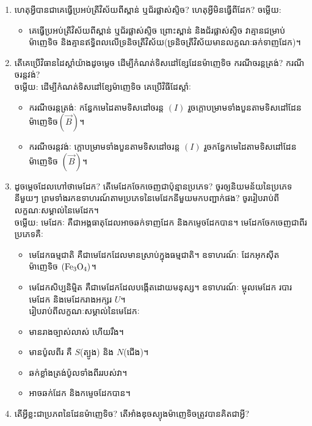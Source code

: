 \documentclass{officialexam}
\begin{document}
\begin{enumerate}[m]
\begin{itemize}
		\end{itemize}
		\item ហេតុអ្វីបានជាគេធ្វើប្រអប់ត្រីវិស័យពីស្ពាន់ ឬជ័រផ្លាស់ស្ទិច? ហេតុអ្វីមិនធ្វើពីដែក? {\color{red}\sffamily ចម្លើយ}:
		\begin{itemize}
			\item គេធ្វើប្រអប់ត្រីវិស័យពីស្ពាន់ ឬជ័រផ្លាស់ស្ទិច ព្រោះស្ពាន់ និងជ័រផ្លាស់ស្ទិច វាគ្មានជម្រាប់ម៉ាញេទិច និងគ្មានឥទ្ធិពលលើទ្រនិចត្រីវិស័យ(ទ្រនិចត្រីវិស័យមានលក្ខណៈឆក់ទាញដែក)។
		\end{itemize}
		\item តើគេប្រើវិធានដៃស្តាំយ៉ាងដូចម្តេច ដើម្បីកំណត់ទិសដៅខ្សែដែនម៉ាញេទិច ករណីចរន្តត្រង់? ករណីចរន្តវង់?\\
		{\color{red}\sffamily ចម្លើយ}: ដើម្បីកំណត់ទិសដៅខ្សែម៉ាញេទិច គេប្រើវិធីដែស្តាំៈ
		\begin{itemize}
			\item ករណីចរន្តត្រង់ៈ កន្ធែកមេដៃតាមទិសដៅចរន្ត $\left(I\right)$ រួចក្តោបម្រាមទាំងបួនតាមទិសដៅដែនម៉ាញេទិច$\left(\overrightarrow{B}\right)$។
			\item ករណីចរន្តវង់ៈ ក្តោបម្រាមទាំងបួនតាមទិសដៅចរន្ត $\left(I\right)$ រួចកន្ធែកមេដៃតាមទិសដៅដែនម៉ាញេទិច $\left(\overrightarrow{B}\right)$។
		\end{itemize}
		\item ដូចម្តេចដែលហៅថាមេដែក? តើមេដែកចែកចេញជាប៉ុន្មានប្រភេទ? ចូរឲ្យនិយមន័យនៃប្រភេទនីមួយៗ ព្រមទាំងរកឧទាហរណ៍តាមប្រភេទនៃមេដែកនីមួយមកបញ្ជាក់ផង? ចូររៀបរាប់ពីលក្ខណៈសម្គាល់នៃមេដែក។\\
		{\color{red}\sffamily ចម្លើយ}: មេដែកៈ គឺជាអង្គធាតុដែលអាចឆក់ទាញដែក និងកម្ទេចដែកបាន។ មេដែកចែកចេញជាពីរប្រភេទគឺៈ 
		\begin{itemize}
			\item មេដែកធម្មជាតិ គឺជាមេដែកដែលមានស្រាប់ក្នុងធម្មជាតិ។ ឧទាហរណ៍ៈ ដែកអុកសុីតម៉ាញេទិច $\left(\ce{Fe3O4}\right)$។
			\item មេដែកសិប្បនិមិ្មត គឺជាមេដែកដែលបង្កើតដោយមនុស្ស។ ឧទាហរណ៍ៈ ម្ចុលមេដែក របារមេដែក និងមេដែករាងអក្សរ $U$។\\
			រៀបរាប់ពីលក្ខណៈសម្គាល់នៃមេដែកៈ
			\item មានរាងច្បាស់លាស់ ហើយរឹង។
			\item មានប៉ូលពីរ គឺ $S$(ត្បូង) និង $N$(ជើង)។
			\item ឆក់ខ្លាំងត្រង់ប៉ូលទាំងពីររបស់វា។
			\item អាចឆក់ដែក និងកម្ទេចដែកបាន។
		\end{itemize}
		\item តើអ្វីខ្លះជាប្រភពនៃដែនម៉ាញេទិច? តើអាំងឌុចស្យុងម៉ាញេទិចត្រូវបានគិតជាអ្វី?\\

\end{enumerate}
\end{document}
